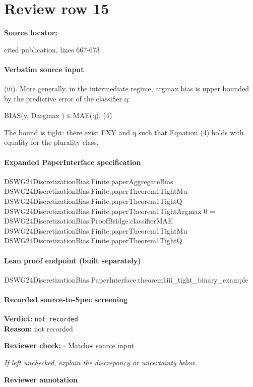 \documentclass[10pt]{article}
\newcommand{\reviewerbox}{%
  \par\noindent\fbox{\parbox{0.96\linewidth}{\rule{0pt}{0.38in}}}\par
}
\newcommand{\reviewmatch}[1]{%
  \par\noindent\textbf{Reviewer check:} $\square$\; #1\par
  \noindent\emph{If left unchecked, explain the discrepancy or uncertainty below.}\par
}
\begin{document}
\section*{Review row 15}
\textbf{Source locator:} {\footnotesize\raggedright cited publication, lines 667-\allowbreak{}673\par}
\paragraph{Verbatim source input}
\begin{ReviewVerbatim}
(iii). More generally, in the intermediate regime, argmax bias is upper bounded by the predictive error of
        the classifier q:

                                                                                                   BIAS(y, Dargmax ) ≤ MAE(q).                                                         (4)

       The bound is tight: there exist FXY and q such that Equation (4) holds with equality for the plurality
       class.
\end{ReviewVerbatim}


\paragraph{Expanded PaperInterface specification}
\begin{ReviewVerbatim}
DSWG24DiscretizationBias.Finite.paperAggregateBias DSWG24DiscretizationBias.Finite.paperTheorem1TightMu
    DSWG24DiscretizationBias.Finite.paperTheorem1TightQ DSWG24DiscretizationBias.Finite.paperTheorem1TightArgmax 0 =
  DSWG24DiscretizationBias.ProofBridge.classifierMAE DSWG24DiscretizationBias.Finite.paperTheorem1TightMu
    DSWG24DiscretizationBias.Finite.paperTheorem1TightQ
\end{ReviewVerbatim}

\paragraph{Lean proof endpoint (built separately)}\begin{ReviewVerbatim}
DSWG24DiscretizationBias.PaperInterface.theorem1iii_tight_binary_example
\end{ReviewVerbatim}

\paragraph{Recorded source-to-Spec screening}
\textbf{Verdict:} \texttt{not recorded}
\\
\textbf{Reason:} not recorded
\reviewmatch{Matches source input}
\noindent\textbf{Reviewer annotation}\par
\reviewerbox
\clearpage
\hypertarget{source-claim-82ddd45159ec7ca3}{}
\end{document}
